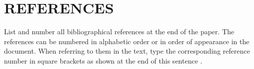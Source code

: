 \documentclass{article}
\begin{document}
\section{REFERENCES}
\label{sec:ref}

List and number all bibliographical references at the end of the paper.  The references can be numbered in alphabetic order or in order of appearance in the document.  When referring to them in the text, type the corresponding reference number in square brackets as shown at the end of this sentence .



\end{document}
